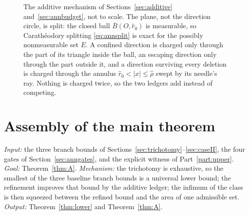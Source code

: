 \documentclass[11pt]{article}
\theoremstyle{plain}
\theoremstyle{definition}
\theoremstyle{remark}
\begin{document}
\begin{figure}[t]
\centering
{}
\caption{The additive mechanism of Sections~\ref{sec:additive}
and~\ref{sec:annbudget}, not to scale. The plane, not the direction circle, is
split: the closed ball $\overline B(O,\hat r_{0})$ is measurable, so
Carath\'eodory splitting \eqref{eq:annsplit} is exact for the possibly
nonmeasurable set $E$. A confined direction is charged only through the part of
its triangle inside the ball, an escaping direction only through the part
outside it, and a direction surviving every deletion is charged through the
annulus $\hat r_{0}<|x|\le\hat\rho$ swept by its needle's ray. Nothing is
charged twice, so the two ledgers add instead of competing.}
\label{fig:annsplit}
\end{figure}

\section{Assembly of the main theorem}\label{sec:assembly}

\emph{Input:} the three branch bounds of
Sections~\ref{sec:trichotomy}--\ref{sec:caseII}, the four gates of
Section~\ref{sec:anngates}, and the explicit witness of Part~\ref{part:upper}.
\emph{Goal:} Theorem~\ref{thm:A}. \emph{Mechanism:} the trichotomy is
exhaustive, so the smallest of the three baseline branch bounds is a universal
lower bound; the refinement improves that bound by the additive ledger; the
infimum of the class is then squeezed between the refined bound and the area of
one admissible set. \emph{Output:} Theorem~\ref{thm:lower} and
Theorem~\ref{thm:A}.
\end{document}
